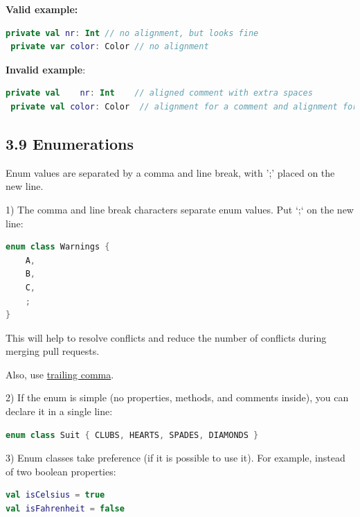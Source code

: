 {{{{\textbf{Valid example:}

\begin{lstlisting}[language=Kotlin]
 private val nr: Int // no alignment, but looks fine
 private var color: Color // no alignment
\end{lstlisting}


\textbf{Invalid example}:

\begin{lstlisting}[language=Kotlin]
 private val    nr: Int    // aligned comment with extra spaces
 private val color: Color  // alignment for a comment and alignment for identifier name
\end{lstlisting}


\subsection*{\textbf{3.9 Enumerations}}

\label{sec:3.9}

Enum values are separated by a comma and line break, with ';' placed on the new line.



1) The comma and line break characters separate enum values. Put `;` on the new line:

\begin{lstlisting}[language=Kotlin]
enum class Warnings {
    A,
    B,
    C,
    ;
}
\end{lstlisting}


This will help to resolve conflicts and reduce the number of conflicts during merging pull requests.

Also, use \href{https://kotlinlang.org/docs/reference/whatsnew14.html#trailing-comma}{trailing comma}.



2) If the enum is simple (no properties, methods, and comments inside), you can declare it in a single line:

\begin{lstlisting}[language=Kotlin]
enum class Suit { CLUBS, HEARTS, SPADES, DIAMONDS }
\end{lstlisting}


3) Enum classes take preference (if it is possible to use it). For example, instead of two boolean properties:



\begin{lstlisting}[language=Kotlin]
val isCelsius = true
val isFahrenheit = false
\end{lstlisting}


}}}}
